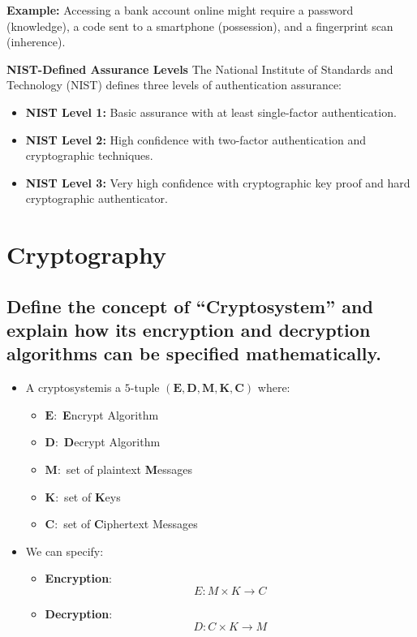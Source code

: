 \documentclass[9pt, letterpaper]{article}
\begin{document}
\textbf{Example:} Accessing a bank account online might require a password (knowledge), a code sent to a smartphone (possession), and a fingerprint scan (inherence).

\textbf{NIST-Defined Assurance Levels}
The National Institute of Standards and Technology (NIST) defines three levels of authentication assurance:

\begin{itemize}
    \item \textbf{NIST Level 1:} Basic assurance with at least single-factor authentication.
    \item \textbf{NIST Level 2:} High confidence with two-factor authentication and cryptographic techniques.
    \item \textbf{NIST Level 3:} Very high confidence with cryptographic key proof and hard cryptographic authenticator.
\end{itemize}


\section{Cryptography}

\subsection{Define the concept of “Cryptosystem” and explain how its encryption and decryption algorithms can be specified mathematically.}
\begin{itemize}
	\item A cryptosystemis a $5$-tuple $(\mathbf{E},\mathbf{D},\mathbf{M},\mathbf{K},\mathbf{C})$ where:
	      \begin{itemize}
		      \item $\mathbf{E}:$ \textbf{E}ncrypt Algorithm
		      \item $\mathbf{D}:$ \textbf{D}ecrypt Algorithm
		      \item $\mathbf{M}:$ set of plaintext \textbf{M}essages
		      \item $\mathbf{K}:$ set of \textbf{K}eys
		      \item $\mathbf{C}:$ set of \textbf{C}iphertext Messages
	      \end{itemize}
	\item We can specify:
	      \begin{itemize}
		      \item \textbf{Encryption}: $$E: M \times K \to C$$
		      \item \textbf{Decryption}: $$D: C \times K \to M$$
	      \end{itemize}
\end{itemize}
\end{document}
